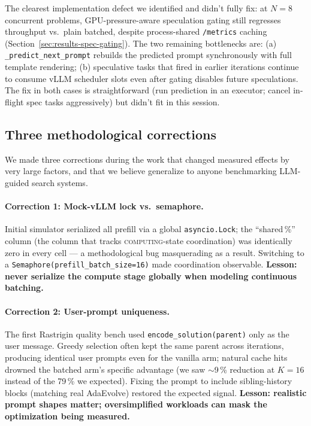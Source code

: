 \documentclass[11pt]{article}
\newcommand{\adaev}{AdaEvolve}
\begin{document}
The clearest implementation defect we identified and didn't fully
fix: at $N{=}8$ concurrent problems, GPU-pressure-aware speculation
gating still regresses throughput vs.~plain batched, despite
process-shared \texttt{/metrics} caching (Section~\ref{sec:results-spec-gating}).
The two remaining bottlenecks are: (a) \verb|_predict_next_prompt|
rebuilds the predicted prompt synchronously with full template
rendering; (b) speculative tasks that fired in earlier iterations
continue to consume vLLM scheduler slots even after gating disables
future speculations. The fix in both cases is straightforward (run
prediction in an executor; cancel in-flight spec tasks aggressively)
but didn't fit in this session.

\subsection{Three methodological corrections}
\label{sec:discussion-method}

We made three corrections during the work that changed measured
effects by very large factors, and that we believe generalize to
anyone benchmarking LLM-guided search systems.

\paragraph{Correction 1: Mock-vLLM lock vs.~semaphore.}
Initial simulator serialized all prefill via a global
\verb|asyncio.Lock|; the ``shared\,\%'' column (the column that
tracks \textsc{computing}-state coordination) was identically zero
in every cell --- a methodological bug masquerading as a result.
Switching to a \verb|Semaphore(prefill_batch_size=16)| made
coordination observable. \textbf{Lesson: never serialize the compute
stage globally when modeling continuous batching.}

\paragraph{Correction 2: User-prompt uniqueness.}
The first Rastrigin quality bench used \verb|encode_solution(parent)|
only as the user message. Greedy selection often kept the same
parent across iterations, producing identical user prompts even for
the vanilla arm; natural cache hits drowned the batched arm's
specific advantage (we saw $\sim$9\,\% reduction at $K{=}16$ instead
of the 79\,\% we expected). Fixing the prompt to include
sibling-history blocks (matching real \adaev{}) restored the
expected signal. \textbf{Lesson: realistic prompt shapes matter;
oversimplified workloads can mask the optimization being measured.}
\end{document}
